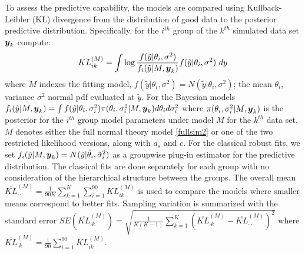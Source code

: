 \documentclass[ba]{imsart}
\newcommand{\by}{\mbox{\boldmath $y$}}
\begin{document}
To assess the predictive capability, the models are compared using Kullback-Leibler (KL) divergence from the distribution of good data to the posterior predictive distribution. Specifically, for the $i^{th}$ group of the $k^{th}$ simulated data set $\by_{k}$ compute:
\begin{equation}
\label{kl}
KL^{(M)}_{ik} = \int \log \frac{f(\tilde y | \theta_{i}, \sigma^{2})}{f_{i}(\tilde y | M, \by_{k})}  f(\tilde y | \theta_{i}, \sigma^{2}) \ dy
\end{equation}
where $M$ indexes the fitting model, $f(\tilde y | \theta_{i}, \sigma^{2}) = N(\tilde y | \theta_{i}, \sigma^{2})$; the mean $\theta_{i}$, variance $\sigma^{2}$ normal pdf evaluated at $\tilde y$. For the Bayesian models ${f_{i}(\tilde y | M, \by_{k})} = \int f(\tilde y |\theta_{i}, \sigma_{i}^{2}) \pi(\theta_{i}, \sigma^{2}_{i} | M, \by_{k})d\theta_{i}d\sigma^{2}_{i}$ where $\pi(\theta_{i}, \sigma^{2}_{i} | M, \by_{k})$ is the posterior for the $i^{th}$ group model parameters under model $M$ for the $k^{th}$ data set. $M$ denotes either the full normal theory model \eqref{fullsim2} or one of the two restricted likelihood versions, along with $a_{s}$ and $c$. For the classical robust fits, we set $f_{i}(\tilde y | M, \by_{k}) = N(\tilde y|\hat\theta_{i}, \hat\sigma^{2}_{i})$ as a groupwise plug-in estimator for the predictive distribution. The classical fits are done separately for each group with no consideration of the hierarchical structure between the groups. The overall mean $\overline{KL}^{(M)}_{{\cdot}{\cdot}} = \frac{1}{90K} \sum_{k = 1}^{K} \sum_{i=1}^{90} KL^{(M)}_{ik}$ is used to compare the models where smaller means correspond to better fits. Sampling variation is summarized with the standard error $SE(\overline{KL}^{(M)}_{{\cdot} k}) = \sqrt{\frac{1}{K(K-1)}\sum_{k = 1}^{K} (\overline{KL}^{(M)}_{{\cdot} k} - \overline{KL}^{(M)}_{{\cdot}{\cdot}})^{2}}$ where $\overline{KL}^{(M)}_{{\cdot} k} = \frac{1}{90}\sum_{i = 1}^{90} KL^{(M)}_{ik}$.
 
\end{document}
